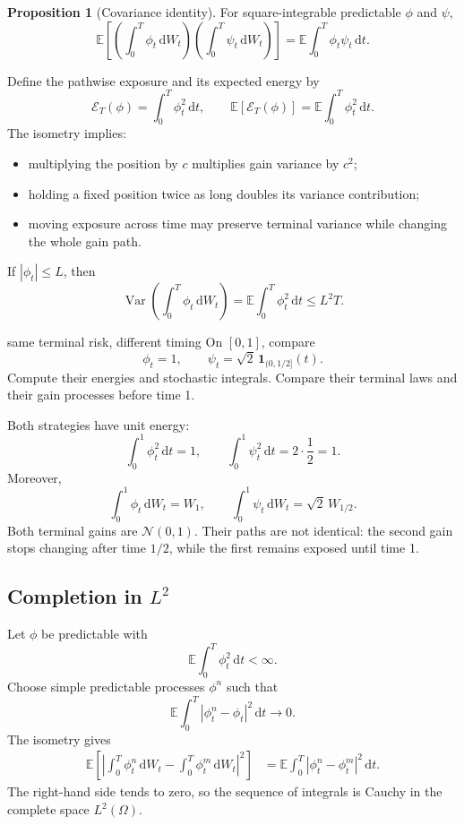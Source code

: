 \documentclass[10pt]{article}
\newcommand{\E}{\mathbb E}
\newcommand{\1}{\mathbf 1}
\newcommand{\dd}{\,\mathrm d}
\DeclareMathOperator{\Var}{Var}
\theoremstyle{definition}
\newtheorem{proposition}[definition]{Proposition}
\begin{document}
\begin{proposition}[Covariance identity]
For square-integrable predictable \(\phi\) and \(\psi\),
\[
\boxed{
\E\left[
\left(\int_0^T\phi_t\dd W_t\right)
\left(\int_0^T\psi_t\dd W_t\right)
\right]
=\E\int_0^T\phi_t\psi_t\dd t.}
\]
\end{proposition}

Define the pathwise exposure and its expected energy by
\[
\mathcal E_T(\phi)=\int_0^T\phi_t^2\dd t,
\qquad
\E[\mathcal E_T(\phi)]=\E\int_0^T\phi_t^2\dd t.
\]
The isometry implies:
\begin{itemize}
  \item multiplying the position by \(c\) multiplies gain variance by \(c^2\);
  \item holding a fixed position twice as long doubles its variance contribution;
  \item moving exposure across time may preserve terminal variance while changing
        the whole gain path.
\end{itemize}
If \(|\phi_t|\leq L\), then
\[
\Var\left(\int_0^T\phi_t\dd W_t\right)
=\E\int_0^T\phi_t^2\dd t\leq L^2T.
\]

\begin{studentexercise}{same terminal risk, different timing}
On \([0,1]\), compare
\[
\phi_t=1,
\qquad
\psi_t=\sqrt2\,\1_{(0,1/2]}(t).
\]
Compute their energies and stochastic integrals. Compare their terminal laws
and their gain processes before time 1.
\end{studentexercise}

\begin{shortsolution}
Both strategies have unit energy:
\[
\int_0^1\phi_t^2\dd t=1,
\qquad
\int_0^1\psi_t^2\dd t=2\cdot\frac12=1.
\]
Moreover,
\[
\int_0^1\phi_t\dd W_t=W_1,
\qquad
\int_0^1\psi_t\dd W_t=\sqrt2\,W_{1/2}.
\]
Both terminal gains are \(\mathcal N(0,1)\). Their paths are not identical:
the second gain stops changing after time \(1/2\), while the first remains
exposed until time 1.
\end{shortsolution}

\subsection{Completion in \texorpdfstring{\(L^2\)}{L2}}

Let \(\phi\) be predictable with
\[
\E\int_0^T\phi_t^2\dd t<\infty.
\]
Choose simple predictable processes \(\phi^n\) such that
\[
\E\int_0^T|\phi_t^n-\phi_t|^2\dd t\longrightarrow0.
\]
The isometry gives
\begin{align*}
\E\left[
\left|
\int_0^T\phi_t^n\dd W_t-
\int_0^T\phi_t^m\dd W_t
\right|^2
\right]
&=\E\int_0^T|\phi_t^n-\phi_t^m|^2\dd t.
\end{align*}
The right-hand side tends to zero, so the sequence of integrals is Cauchy in
the complete space \(L^2(\Omega)\).
\end{document}
